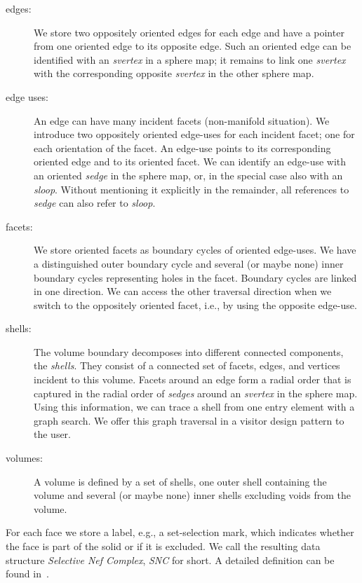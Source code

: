 \begin{description}
    \item[edges:] 
        We store two oppositely oriented edges for each edge
        and have a pointer from one oriented edge to its opposite edge.
        Such an oriented edge can be identified with an \emph{svertex}
        in a sphere map; it remains to link one \emph{svertex} with
        the corresponding opposite \emph{svertex} in the other sphere map.
    \item[edge uses:]
        An edge can have many incident facets (non-manifold situation).
        We introduce two oppositely oriented edge-uses for each incident
        facet; one for each orientation of the facet. An edge-use points 
        to its corresponding oriented edge and to its oriented facet.   
        We can identify an edge-use with an oriented \emph{sedge} in the 
        sphere map, or, in the special case also with an
        \emph{sloop}. Without mentioning it explicitly in the
        remainder, all references to \emph{sedge\/} can also refer to
        \emph{sloop}.
    \item[facets:]
        We store oriented facets as boundary cycles of oriented 
        edge-uses. We have a distinguished outer boundary cycle and 
        several (or maybe none) inner boundary cycles representing holes
        in the facet. Boundary cycles are linked in one direction. We can 
        access the other traversal direction when we switch to the oppositely
        oriented facet, i.e., by using the opposite edge-use.
    \item[shells:]
        The volume boundary decomposes into different connected
        components, the \emph{shells}. They consist of a connected set
        of facets, edges, and vertices incident to this volume. Facets 
        around an edge form a radial order that is captured in the
        radial order of \emph{sedges} around an \emph{svertex} in the
        sphere map. Using this information, we can trace a shell from
        one entry element with a graph search. We offer this graph
        traversal in a visitor design pattern to the user.
    \item[volumes:]
        A volume is defined by a set of shells, one outer shell containing
        the volume and several (or maybe none) inner shells excluding voids
        from the volume.
\end{description}

For each face we store a label, e.g., a set-selection mark, which
indicates whether the face is part of the solid or if it is
excluded. We call the resulting data structure \emph{Selective Nef
Complex}, \emph{SNC} for short. A detailed definition can be found 
in~\cite{cgal:ghhkm-bosnc-03}.


